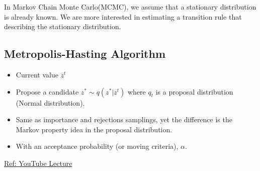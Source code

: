 In Markov Chain Monte Carlo(MCMC), we assume that a stationary distribution is already known. We are more interested in estimating a transition rule that describing the stationary distribution. 

\subsection{Metropolis-Hasting Algorithm}
\begin{itemize}
	\item Current value $z^t$
	\item Propose a candidate $z^*\sim q(z^*|z^t)$ where $q_t$ is a proposal distribution (\ie Normal distribution). 
	\item Same as importance and rejections samplings, yet the difference is the Markov property idea in the proposal distribution. 
	\item With an acceptance probability (or moving criteria), $\alpha$.
\end{itemize}

\href{https://youtu.be/oX2wIGSn4jY}{Ref: YouTube Lecture}

